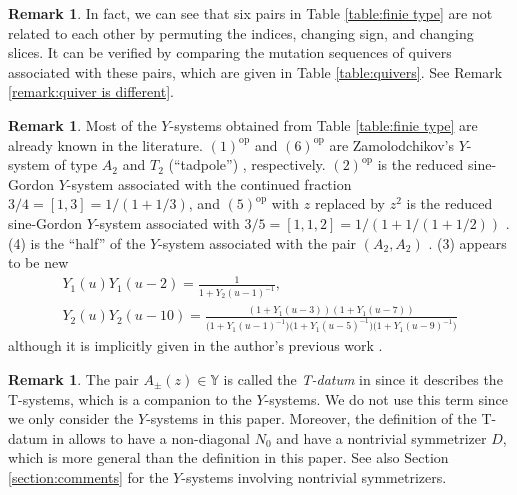 \documentclass[10pt,a4paper]{amsart}
\numberwithin{equation}{section}
\theoremstyle{definition}
\newtheorem{Remark}[Theorem]{Remark}
\begin{document}
\begin{Remark}
 In fact, we can see that six pairs in Table \ref{table:finie type} are not related to each other
 by permuting the indices, changing sign, and changing slices.
 It can be verified by comparing the mutation sequences of quivers associated with these pairs,
 which are given in Table \ref{table:quivers}.
 See Remark \ref{remark:quiver is different}.
\end{Remark}

\begin{Remark}
 Most of the $Y$-systems obtained from Table \ref{table:finie type} are
 already known in the literature. $\mathrm{(1)}^{\mathrm{op}}$ and $\mathrm{(6)}^{\mathrm{op}}$
 are Zamolodchikov's $Y$-system of type $A_2$ \cite{Zamo} and $T_2$ (``tadpole'') \cite{RVT}, respectively.
 $\mathrm{(2)}^{\mathrm{op}}$ is the reduced sine-Gordon $Y$-system associated with the continued fraction~${3/4 = [1,3] = 1/(1+1/3)}$,
 and $\mathrm{(5)}^{\mathrm{op}}$ with $z$ replaced by $z^2$ is the reduced sine-Gordon $Y$-system associated with $3/5 = [1,1,2] = 1/(1+1/(1+1/2))$ \cite{Tateo} .
 (4) is the ``half'' of the $Y$-system associated with the pair $(A_2, A_2)$ \cite{RVT}.
 (3) appears to be new
 \begin{gather*}
 Y_1 (u) Y_1 (u - 2) = \frac{1}{1 + Y_2(u-1)^{-1}}, \\
 Y_2 (u) Y_2 (u - 10) =
 \frac{(1 + Y_1(u-3))(1 + Y_1(u-7))}
 {\bigl(1 + Y_1(u-1)^{-1}\bigr)\bigl(1 + Y_1(u-5)^{-1}\bigr)\bigl(1 + Y_1(u-9)^{-1}\bigr)}
 \end{gather*}
 although it is implicitly given in the author's previous work \cite[Table 2]{mizuno2020difference}.
\end{Remark}

\begin{Remark}
 The pair $A_\pm (z) \in \mathbb{Y}$ is called the \emph{T-datum} in \cite{mizuno2020difference} since
 it describes the T-systems, which is a companion to the $Y$-systems. We do not use this term since
 we only consider the $Y$-systems in this paper.
 Moreover, the definition of the T-datum in \cite{mizuno2020difference} allows to have a non-diagonal $N_0$ and
 have a nontrivial symmetrizer $D$, which is more general than the definition in this paper.
 See also Section \ref{section:comments} for the $Y$-systems involving nontrivial symmetrizers.
\end{Remark}
\end{document}
